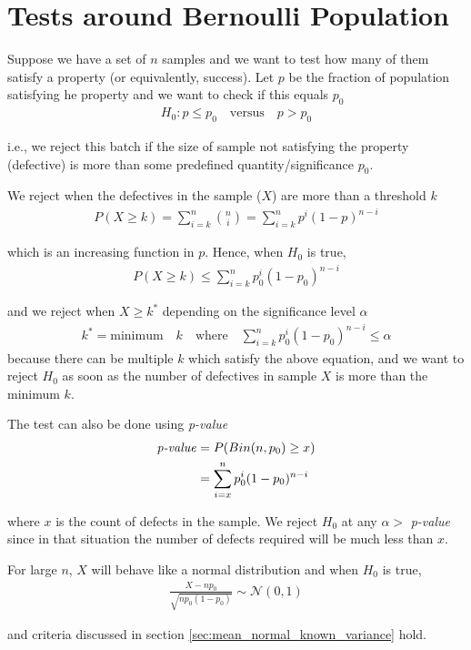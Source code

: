 \documentclass[../probability-notes.tex]{subfiles}
\begin{document}
    \section{Tests around Bernoulli Population}
    Suppose we have a set of $n$ samples and we want to test how many of them satisfy a property (or equivalently, success). Let $p$ be the fraction of population satisfying he property and we want to check if this equals $p_{0}$
    \begin{align*}
        H_{0}: p \leq p_{0} \quad \text{versus} \quad p > p_{0}
    \end{align*}

    i.e., we reject this batch if the size of sample not satisfying the property (defective) is more than some predefined quantity/significance $p_{0}$.\newline

    We reject when the defectives in the sample ($X$) are more than a threshold $k$
    \begin{align*}
        P(X \geq k) = \sum_{i=k}^{n} \binom{n}{i} = \sum_{i=k}^{n} p^{i}(1-p)^{n-i}
    \end{align*}

    which is an increasing function in $p$. Hence, when $H_{0}$ is true,
    \begin{align*}
        P(X \geq k) \leq \sum_{i=k}^{n} p_{0}^{i}(1-p_{0})^{n-i}
    \end{align*}

    and we reject when $X \geq k^{*}$ depending on the significance level $\alpha$
    \begin{align*}
        k^{*} = \text{minimum}\quad k \quad \text{where} \quad \sum_{i=k}^{n} p_{0}^{i}(1-p_{0})^{n-i} \leq \alpha
    \end{align*}
    because there can be multiple $k$ which satisfy the above equation, and we want to reject $H_{0}$ as soon as the number of defectives in sample $X$ is more than the minimum $k$.\newline

    The test can also be done using \emph{p-value}
    \begin{align*}
        \text{\emph{p-value}} &= P(Bin(n, p_{0}) \geq x)\\
        &= \sum_{i=x}^{n}p_{0}^{i}(1-p_{0})^{n-i}
    \end{align*}

    where $x$ is the count of defects in the sample. We reject $H_{0}$ at any $\alpha >$ \emph{p-value} since in that situation the number of defects required will be much less than $x$.

    For large $n$, $X$ will behave like a normal distribution and when $H_{0}$ is true,
    \begin{align*}
        \frac{X - np_{0}}{\sqrt{np_{0}(1-p_{0})}} \sim \mathcal{N}(0,1)
    \end{align*}

    and criteria discussed in section \ref{sec:mean_normal_known_variance} hold.\newline
\end{document}
